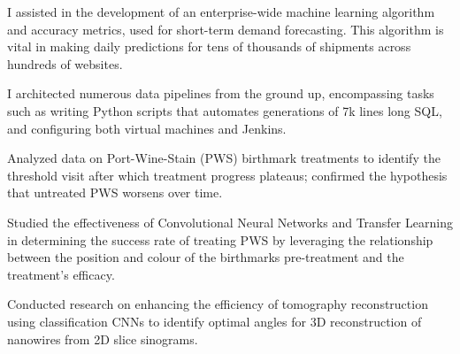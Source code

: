 \documentclass[]{CV}
\begin{document}
\begin{minipage}[t]{0.705\textwidth}
\begin{tightemize}
\begin{tightemize}
\item I assisted in the development of an enterprise-wide machine learning algorithm and accuracy metrics, used for short-term demand forecasting. This algorithm is vital in making daily predictions for tens of thousands of shipments across hundreds of websites.

\item I architected numerous data pipelines from the ground up, encompassing tasks such as writing Python scripts that automates generations of 7k lines long SQL, and configuring both virtual machines and Jenkins.

\quad
\end{tightemize}

\vspace{\topsep}
\begin{tightemize}

\item Analyzed data on Port-Wine-Stain (PWS) birthmark treatments to identify the threshold visit after which treatment progress plateaus; confirmed the hypothesis that untreated PWS worsens over time.

\item Studied the effectiveness of Convolutional Neural Networks and Transfer Learning in determining the success rate of treating PWS by leveraging the relationship between the position and colour of the birthmarks pre-treatment and the treatment's efficacy.


\end{tightemize}
\sectionsep

\vspace{\topsep} %
\begin{tightemize}
\item Conducted research on enhancing the efficiency of tomography reconstruction using classification CNNs to identify optimal angles for 3D reconstruction of nanowires from 2D slice sinograms.


\end{tightemize}
\end{tightemize}
\end{minipage}
\end{document}
